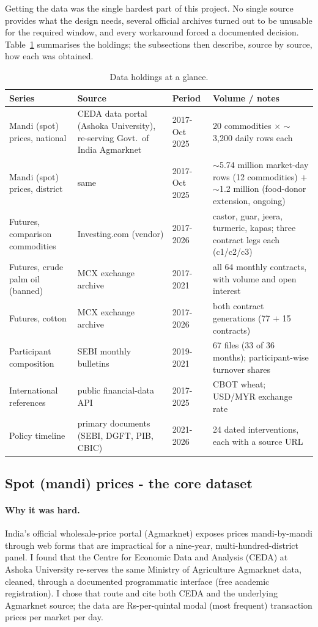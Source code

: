 \documentclass[11pt]{article}
\begin{document}
Getting the data was the single hardest part of this project. No single source provides
what the design needs, several official archives turned out to be unusable for the
required window, and every workaround forced a documented decision. Table~\ref{tab:data}
summarises the holdings; the subsections then describe, source by source, how each was
obtained.

\begin{table}[htbp]
\centering\small
\caption{Data holdings at a glance.}
\label{tab:data}
\begin{tabular}{p{3.6cm} p{3.4cm} p{2.2cm} p{5.2cm}}
\toprule
Series & Source & Period & Volume / notes \\
\midrule
Mandi (spot) prices, national & CEDA data portal (Ashoka University), re-serving Govt.\ of India Agmarknet & 2017-Oct 2025 & 20 commodities $\times$ $\sim$3{,}200 daily rows each \\
Mandi (spot) prices, district & same & 2017-Oct 2025 & $\sim$5.74 million market-day rows (12 commodities) $+$ $\sim$1.2 million (food-donor extension, ongoing) \\
Futures, comparison commodities & Investing.com (vendor) & 2017-2026 & castor, guar, jeera, turmeric, kapas; three contract legs each (c1/c2/c3) \\
Futures, crude palm oil (banned) & MCX exchange archive & 2017-2021 & all 64 monthly contracts, with volume and open interest \\
Futures, cotton & MCX exchange archive & 2017-2026 & both contract generations (77 $+$ 15 contracts) \\
Participant composition & SEBI monthly bulletins & 2019-2021 & 67 files (33 of 36 months); participant-wise turnover shares \\
International references & public financial-data API & 2017-2025 & CBOT wheat; USD/MYR exchange rate \\
Policy timeline & primary documents (SEBI, DGFT, PIB, CBIC) & 2021-2026 & 24 dated interventions, each with a source URL \\
\bottomrule
\end{tabular}
\end{table}

\subsection{Spot (mandi) prices - the core dataset}
\label{sec:data-spot}

\paragraph{Why it was hard.} India's official wholesale-price portal (Agmarknet) exposes
prices mandi-by-mandi through web forms that are impractical for a nine-year,
multi-hundred-district panel. I found that the Centre for Economic Data and Analysis
(CEDA) at Ashoka University re-serves the same Ministry of Agriculture Agmarknet data,
cleaned, through a documented programmatic interface (free academic registration). I chose
that route and cite both CEDA and the underlying Agmarknet source; the data are
Rs-per-quintal modal (most frequent) transaction prices per market per day.
\end{document}
